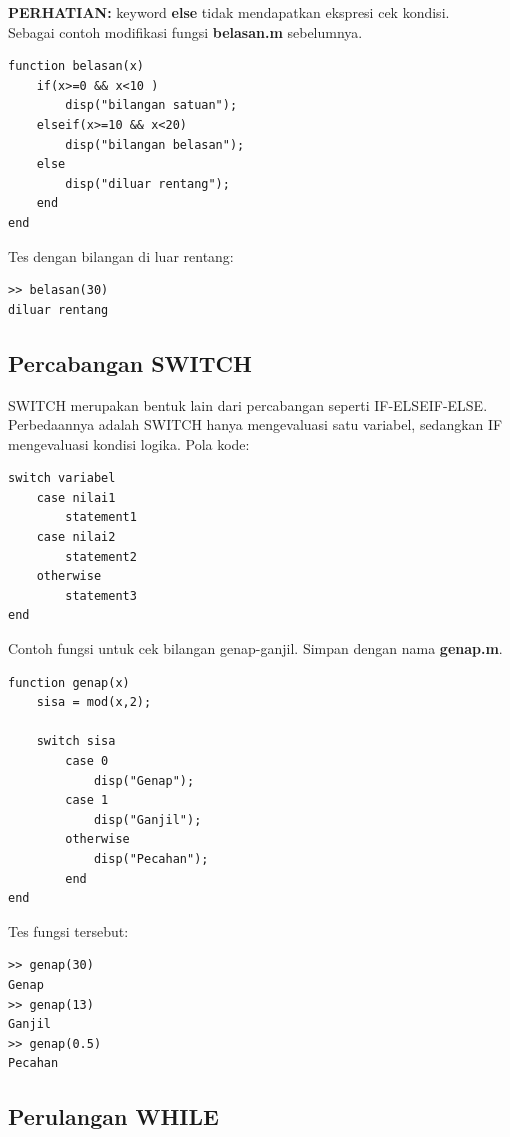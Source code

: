 \documentclass[12pt]{book}
\begin{document}
	\textbf{PERHATIAN:} keyword \textbf{else} tidak mendapatkan ekspresi cek kondisi.\\
	
	Sebagai contoh modifikasi fungsi \textbf{belasan.m} sebelumnya.
	\begin{verbatim}
function belasan(x)
	if(x>=0 && x<10 )
		disp("bilangan satuan");
	elseif(x>=10 && x<20)
		disp("bilangan belasan");
	else
		disp("diluar rentang");
	end
end
	\end{verbatim}

	\newpage
	Tes dengan bilangan di luar rentang:
	\begin{verbatim}
>> belasan(30)
diluar rentang
	\end{verbatim}

	\subsection{Percabangan SWITCH}
	
	SWITCH merupakan bentuk lain dari percabangan seperti IF-ELSEIF-ELSE.
	Perbedaannya adalah SWITCH hanya mengevaluasi satu variabel, sedangkan IF mengevaluasi kondisi logika.
	Pola kode:
	\begin{verbatim}
switch variabel
	case nilai1
		statement1
	case nilai2
		statement2
	otherwise
		statement3
end
	\end{verbatim}

	Contoh fungsi untuk cek bilangan genap-ganjil.
	Simpan dengan nama \textbf{genap.m}.
	\begin{verbatim}
function genap(x)
	sisa = mod(x,2);
	
	switch sisa
		case 0
			disp("Genap");
		case 1
			disp("Ganjil");
		otherwise
			disp("Pecahan");
		end
end
	\end{verbatim}

	Tes fungsi tersebut:
	\begin{verbatim}
>> genap(30)
Genap
>> genap(13)
Ganjil
>> genap(0.5)
Pecahan
	\end{verbatim}
	
	\newpage
	\subsection{Perulangan WHILE}
	
\end{document}
